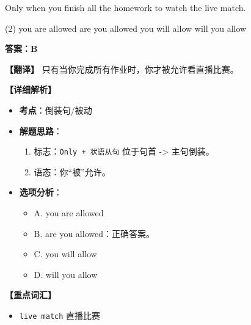 \documentclass[11pt, a4paper]{article}
\newcommand{\analysis}[4]{
    \begin{solutionbox}
        \textbf{答案：#1}
        
        \textbf{【翻译】} #2
        
        \textbf{【详细解析】}
        #3
        
        \textbf{【重点词汇】}
        #4
    \end{solutionbox}
}
\newcommand{\blank}{\underline{\hspace{1.5cm}}}
\begin{document}
\begin{questions}
    \item Only when you finish all the homework \blank to watch the live match.
    \begin{tasks}(2)
        \task you are allowed \task are you allowed
        \task you will allow \task will you allow
    \end{tasks}
    \analysis{B}{只有当你完成所有作业时，你才被允许看直播比赛。}{
        \begin{itemize}
            \item \textbf{考点}：倒装句/被动
            \item \textbf{解题思路}：
                \begin{enumerate}
                    \item 标志：\texttt{Only + 状语从句} 位于句首 -> 主句倒装。
                    \item 语态：你“被”允许。
                \end{enumerate}
            \item \textbf{选项分析}：
                \begin{itemize}
                    \item A. you are allowed
                    \item B. are you allowed：正确答案。
                    \item C. you will allow
                    \item D. will you allow
                \end{itemize}
        \end{itemize}
    }{
        \begin{itemize}
            \item \texttt{live match} 直播比赛
        \end{itemize}
    }


\end{questions}
\end{document}
